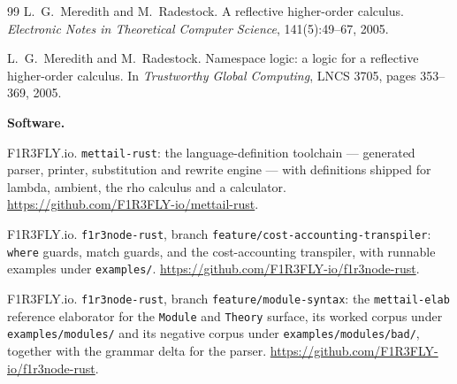\documentclass[11pt]{article}
\theoremstyle{definition}
\theoremstyle{plain}
\theoremstyle{remark}
\newcommand{\rhoc}{\textsf{rho}}
\begin{document}
\begin{thebibliography}{99}
L.~G.~Meredith and M.~Radestock.
\newblock A reflective higher-order calculus.
\newblock \emph{Electronic Notes in Theoretical Computer Science},
141(5):49--67, 2005.

L.~G.~Meredith and M.~Radestock.
\newblock Namespace logic: a logic for a reflective higher-order calculus.
\newblock In \emph{Trustworthy Global Computing}, LNCS 3705, pages 353--369,
2005.

\bigskip
\noindent\textbf{Software.}

F1R3FLY.io.
\newblock \texttt{mettail-rust}: the language-definition toolchain --- generated
parser, printer, substitution and rewrite engine --- with definitions shipped
for lambda, ambient, the \rhoc{} calculus and a calculator.
\newblock \url{https://github.com/F1R3FLY-io/mettail-rust}.

F1R3FLY.io.
\newblock \texttt{f1r3node-rust}, branch
\texttt{feature/cost-accounting-transpiler}: \texttt{where} guards, match
guards, and the cost-accounting transpiler, with runnable examples under
\texttt{examples/}.
\newblock \url{https://github.com/F1R3FLY-io/f1r3node-rust}.

F1R3FLY.io.
\newblock \texttt{f1r3node-rust}, branch \texttt{feature/module-syntax}: the
\texttt{mettail-elab} reference elaborator for the \texttt{Module} and
\texttt{Theory} surface, its worked corpus under
\texttt{examples/modules/} and its negative corpus under
\texttt{examples/modules/bad/}, together with the grammar delta for the parser.
\newblock \url{https://github.com/F1R3FLY-io/f1r3node-rust}.

\end{thebibliography}
\end{document}
